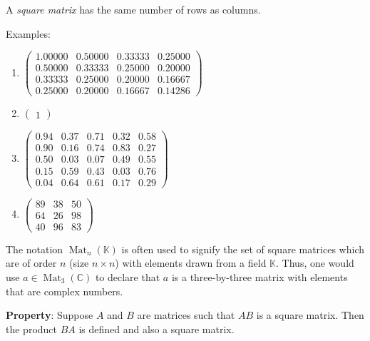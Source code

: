 \documentclass[12pt]{article}
\begin{document}
A \emph{square matrix} has the same number of rows as columns.

Examples:

\begin{enumerate}

\item

$\begin{pmatrix}
  1.00000 & 0.50000 & 0.33333 & 0.25000 \\
  0.50000 & 0.33333 & 0.25000 & 0.20000 \\
  0.33333 & 0.25000 & 0.20000 & 0.16667 \\
  0.25000 & 0.20000 & 0.16667 & 0.14286
\end{pmatrix} $

\item

$\begin{pmatrix}1\end{pmatrix}$

\item
 
$\begin{pmatrix}
  0.94 & 0.37 & 0.71 & 0.32 & 0.58 \\
  0.90 & 0.16 & 0.74 & 0.83 & 0.27 \\
  0.50 & 0.03 & 0.07 & 0.49 & 0.55 \\
  0.15 & 0.59 & 0.43 & 0.03 & 0.76 \\
  0.04 & 0.64 & 0.61 & 0.17 & 0.29 
\end{pmatrix}$

\item

$\begin{pmatrix} 89 & 38 & 50 \\  64 & 26 & 98 \\  40 & 96 & 83 \end{pmatrix}$

\end{enumerate}

The notation $\operatorname{Mat}_n(\mathbb{K})$ is often used to signify the set of square matrices which are of order $n$ (size $n \times n$) with elements drawn from a field $\mathbb{K}$.  Thus, one would use $a \in  \operatorname{Mat}_3(\mathbb{C})$ to declare that $a$ is a three-by-three matrix   with elements that are complex numbers.

\textbf{Property}: Suppose $A$ and $B$ are matrices such that $AB$ is a square matrix.  Then the product $BA$ is defined and also a square matrix.
\end{document}
